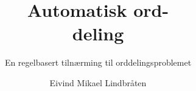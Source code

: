 \documentclass[norsk,a4paper]{ifimaster}  %
\title{Automatisk ord-\\deling}        %
\subtitle{En regelbasert tilnærming til orddelingsproblemet}         %
\author{Eivind Mikael Lindbråten}                      %
\begin{document}
\ififorside{}
\end{document}
